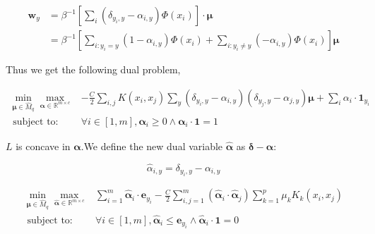 \documentclass{article}
\begin{document}
\begin{align}
    \bm{w}_{y}&=\beta^{-1} \left[\sum_{i}\left(\delta_{y_{i}, y}-\alpha_{i, y}\right) \Phi({x}_{i})\right] \cdot \bm{\mu} \\
              &=\beta^{-1}\left[\sum_{i: y_{i}=y}\left(1-\alpha_{i, y}\right) \Phi(x_i) + \sum_{i: y_{i} \neq y}\left(-\alpha_{i, y}\right) \Phi({x}_{i})\right] \bm{\mu}
\end{align}

Thus we get the following dual problem,

\begin{equation}
    \begin{aligned}
        \min _{\boldsymbol{\mu} \in \widehat{M}_{q}} \max _{\boldsymbol{\alpha} \in \mathbb{R}^{m \times c}} 
        & - \frac{C}{2} \sum_{i,j} K(x_i, x_j) \sum_{y} (\delta_{y_i, y}-\alpha_{i, y}) (\delta_{y_j, y}-\alpha_{j, y}) \bm{\mu}  + \sum_{i} \alpha_{i} \cdot \bm{1}_{y_i} \\
        \text { subject to: }   & \forall i \in[1, m], \boldsymbol{\alpha}_{i} \geq 0 \wedge \bm{\alpha}_{i} \cdot \mathbf{1}= 1
    \end{aligned}
\end{equation}

$L$ is concave in $\bm{\alpha}$.We define the new dual variable $\boldsymbol{\hat{\alpha}}$ as $\bm{\delta}-\bm{\alpha}$:

\begin{equation}
    \hat{\alpha}_{i, y} = \delta_{y_i, y}-\alpha_{i, y}
\end{equation}

\begin{equation}
    \begin{aligned}
        \min _{\boldsymbol{\mu} \in \widehat{M}_{q}} \max _{\boldsymbol{\hat{\alpha}} \in \mathbb{R}^{m \times c}} & \sum_{i=1}^{m} \boldsymbol{\hat{\alpha}}_{i} \cdot \mathbf{e}_{y_{i}}-\frac{C}{2} \sum_{i, j=1}^{m}\left(\boldsymbol{\hat{\alpha}}_{i} \cdot \boldsymbol{\hat{\alpha}}_{j}\right) \sum_{k=1}^{p} \mu_{k} K_{k}\left(x_{i}, x_{j}\right) \\
        \text { subject to: }                                                                                & \forall i \in[1, m], \boldsymbol{\hat{\alpha}}_{i} \leq \mathbf{e}_{y_{i}} \wedge \boldsymbol{\hat{\alpha}}_{i} \cdot \mathbf{1}=0
    \end{aligned}
\end{equation}
\end{document}
